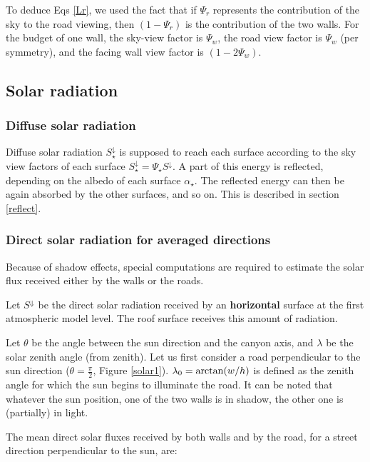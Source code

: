 To deduce Eqs \ref{Lr}, we used the fact that if $\Psi_r$ represents the contribution of
the sky to the road viewing, then $(1-\Psi_r)$ is the contribution
of the two walls.
For the budget of one wall, the sky-view factor is $\Psi_w$, the road view factor
is $\Psi_w$ (per symmetry), and the facing wall view factor is $(1-2\Psi_w)$.

\subsection{Solar radiation}\label{solar}

\subsubsection{Diffuse solar radiation}

Diffuse solar radiation $S_\star^\downarrow$ is supposed to reach each surface according to the sky view factors of each surface  $S_\star^\downarrow = \Psi_\star S^\downarrow$. A part of this energy is reflected, depending on the albedo of each surface $\alpha_\star$. The reflected energy can then be again absorbed by the other surfaces, and so on. This is described in section \ref{reflect}. \\ 


\subsubsection{Direct solar radiation for averaged directions}

Because of shadow effects, special computations are required to
estimate the solar flux
received either by the walls or the roads.

Let $S^\Downarrow$ be the direct solar radiation received by an {\bf horizontal} surface
at the first atmospheric model level. The roof surface receives this
amount of radiation.

Let $\theta$ be the angle between the sun direction and the canyon axis, and
$\lambda$ be the solar zenith angle (from zenith).
Let us first consider a road perpendicular to the sun direction
($\theta=\frac{\pi}{2}$, Figure \ref{solar1}).
$\lambda_0={\rm arctan}(w/h)$ is defined as the zenith angle for which the sun begins to
illuminate the road. It can be noted that whatever the sun position, one of the two walls
is in shadow, the other one is (partially) in light.

The mean direct solar fluxes received by both walls and by the road,
for a street direction perpendicular to the sun, are:

